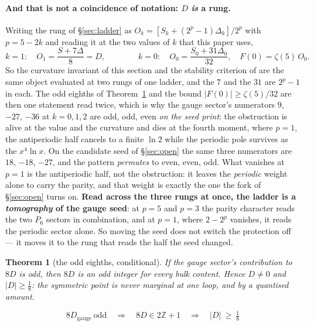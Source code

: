 \documentclass[11pt,a4paper]{article}
\newtheorem{theorem}{Theorem}
\newcommand{\ZZ}{\mathbb{Z}}
\newenvironment{keyeq}
  {\begin{center}\setlength{\fboxsep}{9pt}\setlength{\fboxrule}{0.8pt}%
   \begin{lrbox}{\keyeqbox}\begin{minipage}{0.88\textwidth}}
  {\end{minipage}\end{lrbox}%
   \fcolorbox{hdrblue!55}{hdrblue!6}{\usebox{\keyeqbox}}\end{center}}
\begin{document}
\paragraph{And that is not a coincidence of notation: $D$ \emph{is} a rung.} Writing the rung of
\S\ref{sec:ladder} as $O_k=[S_k+(2^p-1)\Delta_k]/2^p$ with $p=5-2k$ and reading it at the two values
of $k$ that this paper uses,
\[
  k=1:\quad O_1=\frac{S+7\Delta}{8}=D,
  \qquad\qquad
  k=0:\quad O_0=\frac{S_0+31\Delta_0}{32},\quad F(0)=\zeta(5)\,O_0 .
\]
So the curvature invariant of this section and the stability criterion of \cite{CCD24} are the same
object evaluated at two rungs of one ladder, and the $7$ and the $31$ are $2^p-1$ in each. The odd
eighths of Theorem~\ref{thm:eighths} and the bound $|F(0)|\ge\zeta(5)/32$ are then one statement read
twice, which is why the gauge sector's numerators $9$, $-27$, $-36$ at $k=0,1,2$ are odd, odd, even
\emph{on the seed \cite{KM25} print}: the obstruction is alive at the value and the curvature and
dies at the fourth moment, where $p=1$,
the antiperiodic half cancels to a finite $\ln2$ while the periodic pole survives as the
$x^4\ln x$. On the
candidate seed of \S\ref{sec:open} the same three numerators are $18$, $-18$, $-27$, and the
pattern \emph{permutes} to even, even, odd. What vanishes at $p=1$ is the antiperiodic half, not
the obstruction: it leaves the \emph{periodic} weight alone to carry the parity, and that weight
is exactly the one the fork of \S\ref{sec:open} turns on. \textbf{Read across the three rungs at
once, the ladder is a \emph{tomography} of the gauge seed}: at $p=5$ and $p=3$ the parity character
reads the two $P_6$ sectors in combination, and at $p=1$, where $2-2^{p}$ vanishes, it reads the
periodic sector alone. So moving the seed does not switch the protection off --- it moves it to the
rung that reads the half the seed changed.

\begin{theorem}[the odd eighths, conditional]\label{thm:eighths}
\emph{If} the gauge sector's contribution to $8D$ is odd, then $8D$ is an odd integer for every
bulk content. Hence $D\neq0$ and $|D|\ge\tfrac18$: \emph{the symmetric point} is never marginal at
one loop, and by a quantised amount.
\end{theorem}
\begin{keyeq}
\begin{equation}\label{eq:oddeighths}
  8D_{\mathrm{gauge}}\ \text{odd}
  \quad\Longrightarrow\quad 8D\in2\ZZ+1
  \quad\Longrightarrow\quad |D|\ \ge\ \tfrac18
\end{equation}
\end{keyeq}
\end{document}
